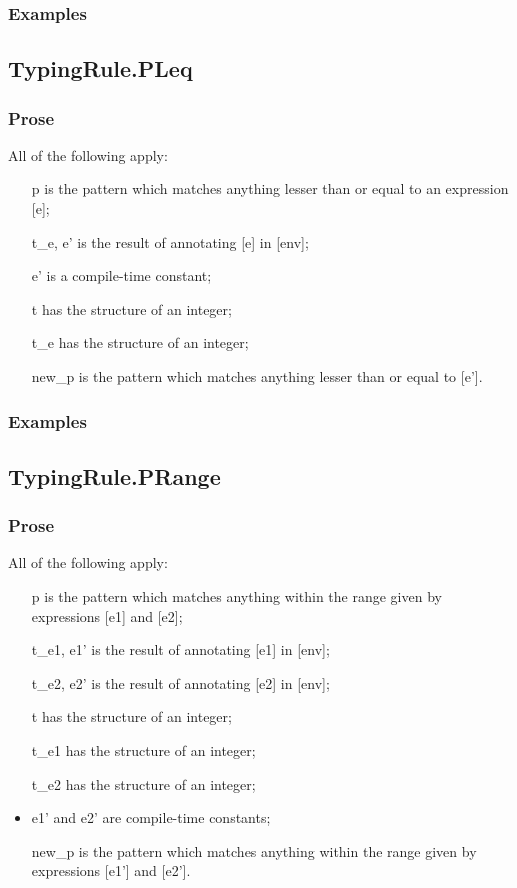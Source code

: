 \documentclass{book}
\begin{document}
    \subsubsection{Examples}

\subsection{TypingRule.PLeq}

    \subsubsection{Prose}
    All of the following apply:
   \begin{itemize}
   \item [p] is the pattern which matches anything lesser than or equal to an expression [e];
   \item [t\_e, e'] is the result of annotating [e] in [env]; 
   \item [e'] is a compile-time constant;
   \item [t] has the structure of an integer;
   \item [t\_e] has the structure of an integer;
   \item [new\_p] is the pattern which matches anything lesser than or equal to [e'].
   \end{itemize}

    \subsubsection{Examples}

\subsection{TypingRule.PRange}

    \subsubsection{Prose}
    All of the following apply:
   \begin{itemize}
   \item [p] is the pattern which matches anything within the range given by
      expressions [e1] and [e2];
   \item [t\_e1, e1'] is the result of annotating [e1] in [env];
   \item [t\_e2, e2'] is the result of annotating [e2] in [env];
   \item [t] has the structure of an integer;
   \item [t\_e1] has the structure of an integer;
   \item [t\_e2] has the structure of an integer;
   \item e1' and e2' are compile-time constants; 
   \item [new\_p] is the pattern which matches anything within the range given by
      expressions [e1'] and [e2'].
   \end{itemize}
\end{document}
